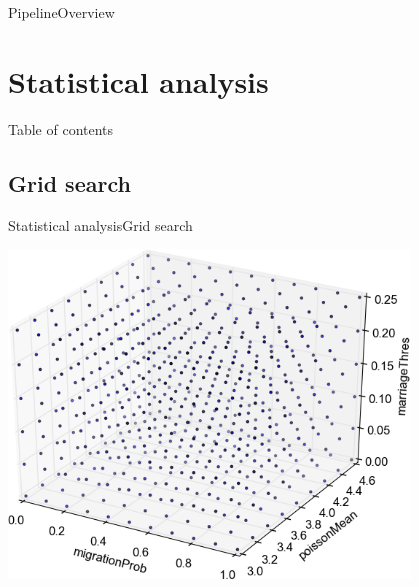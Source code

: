\documentclass[10pt, aspectratio=43]{beamer}
\begin{document}
\addtocounter{framenumber}{-1}
\begin{frame}{Pipeline}{Overview}
\begin{center}
\end{center}
\end{frame}


\section{Statistical analysis}
\begin{frame}{}{Table of contents}
\tableofcontents[currentsection, subsectionstyle=show/show/hide]
\end{frame}

\subsection{Grid search}
\begin{frame}{Statistical analysis}{Grid search}
\begin{center}
  \includegraphics[width=0.8\textwidth]{../data/grid.png}
\end{center}
\end{frame}
\end{document}
